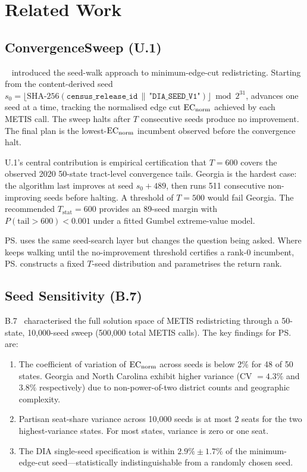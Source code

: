\section{Related Work}
\label{sec:related-work}

\subsection{ConvergenceSweep (U.1)}

\cs{}~\citep{b16paper} introduced the seed-walk approach to minimum-edge-cut
redistricting.
Starting from the content-derived seed $s_0 = \lfloor \text{SHA-256}(\texttt{census\_release\_id}
\,\|\, \texttt{"DIA\_SEED\_V1"}) \rfloor \bmod 2^{31}$, \cs{} advances one seed at
a time, tracking the normalised edge cut $\mathrm{EC}_{\mathrm{norm}}$ achieved by each METIS
call.
The sweep halts after $T$ consecutive seeds produce no improvement.
The final plan is the lowest-$\mathrm{EC}_{\mathrm{norm}}$ incumbent observed before the
convergence halt.

U.1's central contribution is empirical certification that $T = 600$ covers
the observed 2020 50-state tract-level convergence tails.
Georgia is the hardest case: the algorithm last improves at seed $s_0 + 489$,
then runs 511 consecutive non-improving seeds before halting.
A threshold of $T = 500$ would fail Georgia.
The recommended $T_{\mathrm{stat}} = 600$ provides an 89-seed margin with
$P(\mathrm{tail} > 600) < 0.001$ under a fitted Gumbel extreme-value model.

\ps{} uses the same seed-search layer but changes the question being asked.
Where \cs{} keeps walking until the no-improvement threshold certifies a
rank-0 incumbent, \ps{} constructs a fixed $T$-seed distribution and
parametrises the return rank.

\subsection{Seed Sensitivity (B.7)}

B.7~\citep{b7paper} characterised the full solution space of METIS
redistricting through a 50-state, 10,000-seed sweep (500,000 total METIS
calls).
The key findings for \ps{} are:
\begin{enumerate}
\item The coefficient of variation of $\mathrm{EC}_{\mathrm{norm}}$ across seeds is below 2\%
      for 48 of 50 states.
      Georgia and North Carolina exhibit higher variance (CV $= 4.3\%$ and
      $3.8\%$ respectively) due to non-power-of-two district counts and
      geographic complexity.
\item Partisan seat-share variance across 10,000 seeds is at most 2 seats
      for the two highest-variance states.
      For most states, variance is zero or one seat.
\item The DIA single-seed specification is within $2.9\% \pm 1.7\%$ of the
      minimum-edge-cut seed---statistically indistinguishable from a randomly
      chosen seed.
\end{enumerate}


